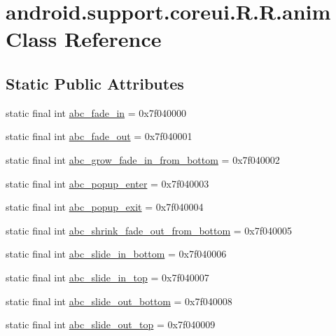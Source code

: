 \hypertarget{classandroid_1_1support_1_1coreui_1_1_r_1_1anim}{
\section{android.support.coreui.R.R.anim Class Reference}
\label{classandroid_1_1support_1_1coreui_1_1_r_1_1anim}
}
\subsection*{Static Public Attributes}
\begin{CompactItemize}
\item 
static final int \hyperlink{classandroid_1_1support_1_1coreui_1_1_r_1_1anim_8d22f59ae7899a7ec6f9bb42cff54e8c}{abc\_\-fade\_\-in} = 0x7f040000
\item 
static final int \hyperlink{classandroid_1_1support_1_1coreui_1_1_r_1_1anim_cafd5b08f6747324718318a83f6fd1f4}{abc\_\-fade\_\-out} = 0x7f040001
\item 
static final int \hyperlink{classandroid_1_1support_1_1coreui_1_1_r_1_1anim_792007e285357bc8a151eab9c7cd851e}{abc\_\-grow\_\-fade\_\-in\_\-from\_\-bottom} = 0x7f040002
\item 
static final int \hyperlink{classandroid_1_1support_1_1coreui_1_1_r_1_1anim_95d53b9ce35fea81a3d528746f55673e}{abc\_\-popup\_\-enter} = 0x7f040003
\item 
static final int \hyperlink{classandroid_1_1support_1_1coreui_1_1_r_1_1anim_5406070d8b33203450a035e68281e45e}{abc\_\-popup\_\-exit} = 0x7f040004
\item 
static final int \hyperlink{classandroid_1_1support_1_1coreui_1_1_r_1_1anim_ff6d0a8a3590b05489d04f1134fe4c62}{abc\_\-shrink\_\-fade\_\-out\_\-from\_\-bottom} = 0x7f040005
\item 
static final int \hyperlink{classandroid_1_1support_1_1coreui_1_1_r_1_1anim_f0abe4e39867519f8ce1c372bbb91f0c}{abc\_\-slide\_\-in\_\-bottom} = 0x7f040006
\item 
static final int \hyperlink{classandroid_1_1support_1_1coreui_1_1_r_1_1anim_2c51c7d15e98759372bee5c7b29f6a2e}{abc\_\-slide\_\-in\_\-top} = 0x7f040007
\item 
static final int \hyperlink{classandroid_1_1support_1_1coreui_1_1_r_1_1anim_f95d537684b0b63fdfea8b6cb3c512d3}{abc\_\-slide\_\-out\_\-bottom} = 0x7f040008
\item 
static final int \hyperlink{classandroid_1_1support_1_1coreui_1_1_r_1_1anim_f11ceaeb990b0c108c7caa43d23a0aff}{abc\_\-slide\_\-out\_\-top} = 0x7f040009

\end{CompactItemize}
